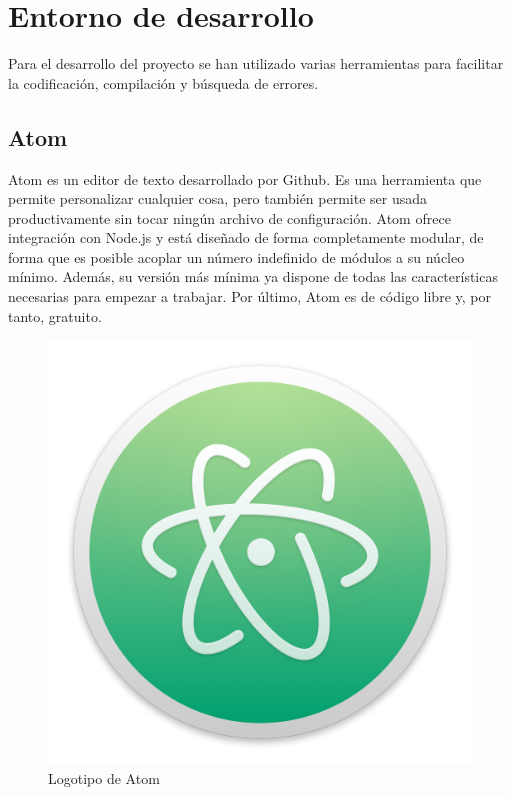 \section{Entorno de desarrollo}

	Para el desarrollo del proyecto se han utilizado varias herramientas para facilitar la codificación, compilación y búsqueda de errores.

	\subsection{Atom}

		Atom es un editor de texto desarrollado por Github. Es una herramienta que permite personalizar cualquier cosa, pero también permite ser usada productivamente sin tocar ningún archivo de configuración. Atom ofrece integración con Node.js y está diseñado de forma completamente modular, de forma que es posible acoplar un número indefinido de módulos a su núcleo mínimo. Además, su versión más mínima ya dispone de todas las características necesarias para empezar a trabajar. Por último, Atom es de código libre y, por tanto, gratuito.

		\begin{figure}[!htp]
			 \centering
			 \includegraphics{fig/atom}
			 \caption{Logotipo de Atom}
			 \label{fig:atom}
		\end{figure}

